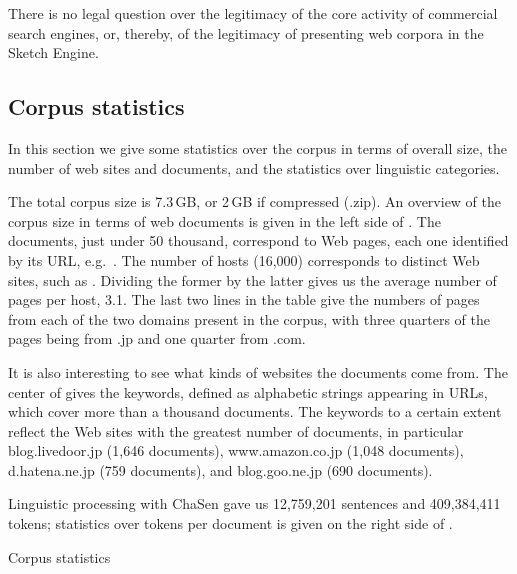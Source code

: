 \documentclass[english]{jnlp_1.4}
\newcommand{\url}[1]{}
\newcommand{\reftab}[1]{}
\begin{document}
There is no legal question over the legitimacy of the core activity of commercial search engines, or, thereby, of the legitimacy of presenting web corpora in the Sketch Engine.



\subsection{Corpus statistics}

In this section we give some statistics over the corpus in terms of overall size, the number of web sites and documents, and the statistics over linguistic categories. 

The total corpus size is 7.3\,GB, or 2\,GB if compressed (.zip). An
overview of the corpus size in terms of web documents is given in
the left side of \reftab{tab1}. 
The documents, just under 50 thousand, correspond to Web
pages, each one identified by its URL,
e.g.\ \url{http://www.arsvi.com/0e/\linebreak[2]ps01.\linebreak[2]htm}. The number of hosts
(16,000) corresponds to distinct Web sites, such as
\url{http://www.\linebreak[2]arsvi.com}. Dividing the former by the latter gives us
the average number of pages per host, 3.1. The last two lines in the
table give the numbers of pages from each of the two domains present
in the corpus, with three quarters of the pages being from .jp and one
quarter from .com.

It is also interesting to see what kinds of websites the documents
come from. The center of \reftab{tab1} gives the keywords, defined as alphabetic
strings appearing in URLs, which cover more than a thousand
documents. The keywords to a certain extent reflect the Web sites with
the greatest number of documents, in particular blog.livedoor.jp
(1,646 documents), www.amazon.co.jp (1,048 documents), d.hatena.ne.jp
(759 documents), and blog.goo.ne.jp (690 documents).

Linguistic processing with ChaSen gave us 12,759,201 sentences and
409,384,411 tokens; statistics over tokens per document is given on
the right side of \reftab{tab1}.

\begin{table}[t]
\begin{center}
\caption{Corpus statistics}

\label{tab1}
\end{center}
\end{table}
\end{document}
